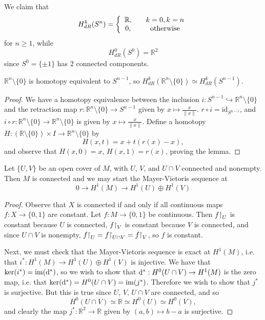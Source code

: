 \begin{xmpl}[Cohomology of $S^n$]
We claim that
$$
  H^k_{dR}(S^n)
= \left\{
    \begin{array}{c c}
      \mathbb{R}, & \quad k = 0, k = n \\
      0,          & \quad \text{otherwise}
    \end{array}
  \right.
$$
for $n \geq 1$, while
$$
  H^0_{dR}(S^0)
= \mathbb{R}^2
$$
since $S^0 = \{ \pm 1 \}$ has 2 connected components.

\begin{lemma}
$\mathbb{R}^n \setminus \{ 0 \}$ is homotopy equivalent to $S^{n-1}$,
so $H_{dR}^k(\mathbb{R}^n \setminus \{ 0 \}) \simeq H^k_{dR}(S^{n-1})$.
\end{lemma}

\begin{proof}
We have a homotopy equivalence between the inclusion
$i : S^{n-1} \hookrightarrow \mathbb{R}^n \setminus \{ 0 \}$ and the
retraction map
$r : \mathbb{R}^n \setminus \{ 0 \} \to S^{n-1}$ given by
$x \mapsto \frac{x}{\| x \|}$. $r \circ i = \mathrm{id}_{S^{n-1}}$,
and
$i \circ r : \mathbb{R}^n \setminus \{ 0 \} \to \mathbb{R}^n \setminus
\{ 0 \}$
is given by $x \mapsto \frac{x}{\| x \|}$. Define a homotopy
$
  H
: (\mathbb{R} \setminus \{ 0 \}) \times I \to \mathbb{R}^n \setminus
\{ 0 \}
$
by
$$
H(x, t) = x + t(r(x) - x),
$$
and observe that $H(x, 0) = x$,
$H(x, 1) = r(x)$, proving the lemma.
\end{proof}

\begin{lemma}
Let $\{ U, V \}$ be an open cover of $M$, with
$U$, $V$, and $U \cap V$ connected and nonempty. Then
$M$ is connected and we may start the Mayer-Vietoris sequence at
$$
0 \to H^1(M) \to H^1(U) \oplus H^1(V)
$$
\end{lemma}

\begin{proof}
Observe that $X$ is connected if and only if all continuous maps
$f : X \to \{ 0, 1 \}$ are constant. Let $f : M \to \{ 0, 1 \}$ be
continuous. Then $f\mathord{\upharpoonright}_U$ is constant because $U$ is connected,
$f\mathord{\upharpoonright}_V$ is constant because $V$ is connected, and since
$U \cap V$ is nonempty,
$f\mathord{\upharpoonright}_U = f\mathord{\upharpoonright}_{U \cap V} = f\mathord{\upharpoonright}_V$, so
$f$ is constant.

Next, we must check that the Mayer-Vietoris sequence is exact at
$H^1(M)$, i.e. that $i^\ast: H^1(M) \to H^1(U) \oplus H^1(V)$ is
injective. We have that $\ker(i^\ast) = \mathrm{im}(\mathop{}\!\mathrm{d}^\ast)$, so we
wish to show that $\mathop{}\!\mathrm{d}^\ast : H^0(U \cap V) \to H^1(M)$ is the zero
map, i.e. that
$\ker(\mathop{}\!\mathrm{d}^\ast) = H^0(U \cap V) = \mathrm{im}(j^\ast)$. Therefore we
wish to show that $j^\ast$ is surjective. But this is true since
$U$, $V$, $U \cap V$ are connected, and so
$$
  H^0(U \cap V) \simeq \mathbb{R} \simeq H^0(U) \simeq H^0(V),
$$
and clearly the map $j^\ast : \mathbb{R}^2 \to \mathbb{R}$ given by
$(a, b) \mapsto b - a$ is surjective.
\end{proof}


\end{xmpl}
